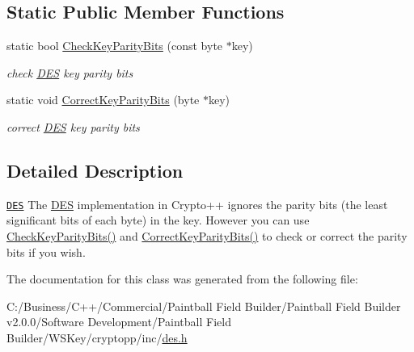 \subsection*{Static Public Member Functions}
\begin{DoxyCompactItemize}
\item 
\hypertarget{class_d_e_s_a812f601fb2a3d6c0bc386cf678115f0c}{
static bool \hyperlink{class_d_e_s_a812f601fb2a3d6c0bc386cf678115f0c}{CheckKeyParityBits} (const byte $\ast$key)}
\label{class_d_e_s_a812f601fb2a3d6c0bc386cf678115f0c}

\begin{DoxyCompactList}\small\item\em check \hyperlink{class_d_e_s}{DES} key parity bits \item\end{DoxyCompactList}\item 
\hypertarget{class_d_e_s_aef4d67cbb5dca3426c97319f647674a7}{
static void \hyperlink{class_d_e_s_aef4d67cbb5dca3426c97319f647674a7}{CorrectKeyParityBits} (byte $\ast$key)}
\label{class_d_e_s_aef4d67cbb5dca3426c97319f647674a7}

\begin{DoxyCompactList}\small\item\em correct \hyperlink{class_d_e_s}{DES} key parity bits \item\end{DoxyCompactList}\end{DoxyCompactItemize}


\subsection{Detailed Description}
\href{http://www.weidai.com/scan-mirror/cs.html#DES}{\tt DES} The \hyperlink{class_d_e_s}{DES} implementation in Crypto++ ignores the parity bits (the least significant bits of each byte) in the key. However you can use \hyperlink{class_d_e_s_a812f601fb2a3d6c0bc386cf678115f0c}{CheckKeyParityBits()} and \hyperlink{class_d_e_s_aef4d67cbb5dca3426c97319f647674a7}{CorrectKeyParityBits()} to check or correct the parity bits if you wish. 

The documentation for this class was generated from the following file:\begin{DoxyCompactItemize}
\item 
C:/Business/C++/Commercial/Paintball Field Builder/Paintball Field Builder v2.0.0/Software Development/Paintball Field Builder/WSKey/cryptopp/inc/\hyperlink{des_8h}{des.h}\end{DoxyCompactItemize}
